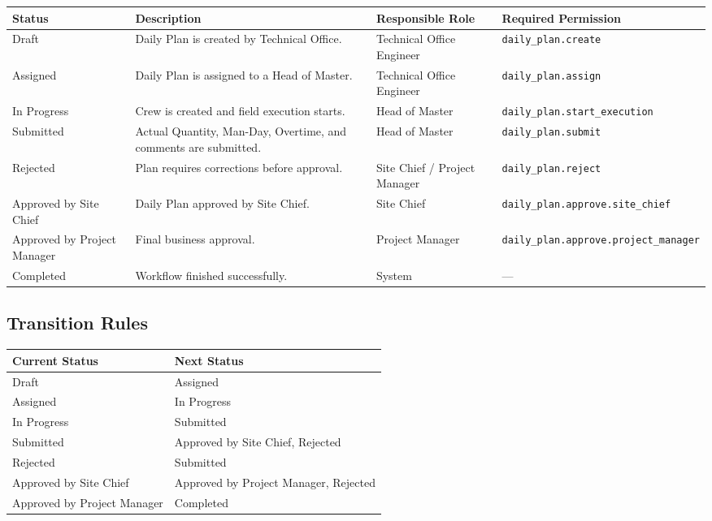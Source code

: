 \documentclass[11pt]{article}
\begin{document}
\renewcommand{\arraystretch}{1.05}
\scriptsize
\begin{tabularx}{\textwidth}{|>{\raggedright\arraybackslash}p{}|>{\raggedright\arraybackslash}X|>{\raggedright\arraybackslash}p{}|>{\raggedright\arraybackslash}p{}|}
    \hline
    \textbf{Status} & \textbf{Description} & \textbf{Responsible Role} &
    \textbf{Required Permission} \\
    \hline
    Draft & Daily Plan is created by Technical Office. & Technical Office
    Engineer & \texttt{daily\_plan.\allowbreak create} \\
    \hline
    Assigned & Daily Plan is assigned to a Head of Master. & Technical Office
    Engineer & \texttt{daily\_plan.\allowbreak assign} \\
    \hline
    In Progress & Crew is created and field execution starts. & Head of Master &
    \texttt{daily\_plan.\allowbreak start\_execution} \\
    \hline
    Submitted & Actual Quantity, Man-Day, Overtime, and comments are submitted.
    & Head of Master & \texttt{daily\_plan.\allowbreak submit} \\
    \hline
    Rejected & Plan requires corrections before approval. & Site Chief / Project
    Manager & \texttt{daily\_plan.\allowbreak reject} \\
    \hline
    Approved by Site Chief & Daily Plan approved by Site Chief. & Site Chief &
    \texttt{daily\_plan.\allowbreak approve.\allowbreak site\_chief} \\
    \hline
    Approved by Project Manager & Final business approval. & Project Manager &
    \texttt{daily\_plan.\allowbreak approve.\allowbreak project\_manager} \\
    \hline
    Completed & Workflow finished successfully. & System & --- \\
    \hline
\end{tabularx}
\renewcommand{\arraystretch}{1}

\subsection{Transition Rules}

\renewcommand{\arraystretch}{1.05}
\begin{tabularx}{\textwidth}{|>{\raggedright\arraybackslash}p{}|>{\raggedright\arraybackslash}X|}
    \hline
    \textbf{Current Status} & \textbf{Next Status} \\
    \hline
    Draft & Assigned \\
    \hline
    Assigned & In Progress \\
    \hline
    In Progress & Submitted \\
    \hline
    Submitted & Approved by Site Chief, Rejected \\
    \hline
    Rejected & Submitted \\
    \hline
    Approved by Site Chief & Approved by Project Manager, Rejected \\
    \hline
    Approved by Project Manager & Completed \\
    \hline
\end{tabularx}
\renewcommand{\arraystretch}{1}
\end{document}
